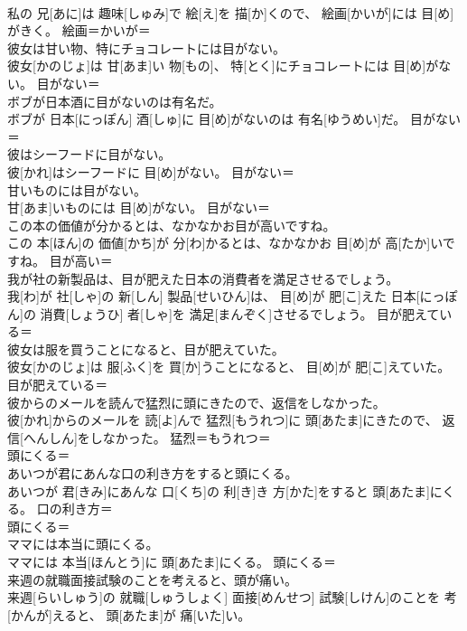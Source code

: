 \documentclass[8pt]{extreport}
\begin{document}
\begin{CJK}{UTF8}{min}
\\	私の 兄[あに]は 趣味[しゅみ]で 絵[え]を 描[か]くので、 絵画[かいが]には 目[め]がきく。	絵画＝かいが＝ 
\\	彼女は甘い物、特にチョコレートには目がない。	
\\	彼女[かのじょ]は 甘[あま]い 物[もの]、 特[とく]にチョコレートには 目[め]がない。	目がない＝ 
\\	ボブが日本酒に目がないのは有名だ。	
\\	ボブが 日本[にっぽん] 酒[しゅ]に 目[め]がないのは 有名[ゆうめい]だ。	目がない＝ 
\\	彼はシーフードに目がない。	
\\	彼[かれ]はシーフードに 目[め]がない。	目がない＝ 
\\	甘いものには目がない。	
\\	甘[あま]いものには 目[め]がない。	目がない＝ 
\\	この本の価値が分かるとは、なかなかお目が高いですね。	
\\	この 本[ほん]の 価値[かち]が 分[わ]かるとは、なかなかお 目[め]が 高[たか]いですね。	目が高い＝ 
\\	我が社の新製品は、目が肥えた日本の消費者を満足させるでしょう。	
\\	我[わ]が 社[しゃ]の 新[しん] 製品[せいひん]は、 目[め]が 肥[こ]えた 日本[にっぽん]の 消費[しょうひ] 者[しゃ]を 満足[まんぞく]させるでしょう。	目が肥えている＝ 
\\	彼女は服を買うことになると、目が肥えていた。	
\\	彼女[かのじょ]は 服[ふく]を 買[か]うことになると、 目[め]が 肥[こ]えていた。	目が肥えている＝ 
\\	彼からのメールを読んで猛烈に頭にきたので、返信をしなかった。	
\\	彼[かれ]からのメールを 読[よ]んで 猛烈[もうれつ]に 頭[あたま]にきたので、 返信[へんしん]をしなかった。	猛烈＝もうれつ＝ 
\\	頭にくる＝ 
\\	あいつが君にあんな口の利き方をすると頭にくる。	
\\	あいつが 君[きみ]にあんな 口[くち]の 利[き]き 方[かた]をすると 頭[あたま]にくる。	口の利き方＝ 
\\	頭にくる＝ 
\\	ママには本当に頭にくる。	
\\	ママには 本当[ほんとう]に 頭[あたま]にくる。	頭にくる＝ 
\\	来週の就職面接試験のことを考えると、頭が痛い。	
\\	来週[らいしゅう]の 就職[しゅうしょく] 面接[めんせつ] 試験[しけん]のことを 考[かんが]えると、 頭[あたま]が 痛[いた]い。	

\end{CJK}
\end{document}
